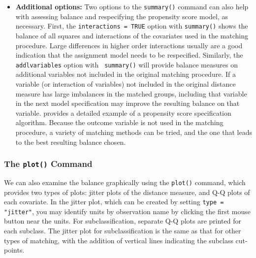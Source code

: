 \begin{itemize}
\item {\bf Additional options:} Two options to the \texttt{summary()}
  command can also help with assessing balance and respecifying the
  propensity score model, as necessary.  First, the {\tt interactions
    = TRUE} option with {\tt summary()} shows the balance of all
  squares and interactions of the covariates used in the matching
  procedure.  Large differences in higher order interactions usually
  are a good indication that the assignment model needs to be
  respecified.  Similarly, the {\tt addlvariables} option with {\tt
    summary()} will provide balance measures on additional variables
  not included in the original matching procedure.  If a variable (or
  interaction of variables) not included in the original distance
  measure has large imbalances in the matched groups, including that
  variable in the next model specification may improve the resulting
  balance on that variable.  \cite{DehWah99} provides a detailed
  example of a propensity score specification algorithm.  Because the
  outcome variable is not used in the matching procedure, a variety of
  matching methods can be tried, and the one that leads to the best
  resulting balance chosen.
\end{itemize}

\subsubsection{The \texttt{plot()} Command}

We can also examine the balance graphically using the \texttt{plot()}
command, which provides two types of plots: jitter plots of the
distance measure, and Q-Q plots of each covariate.  In the jitter
plot, which can be created by setting \texttt{type = "jitter"}, you
may identify units by observation name by clicking the first mouse
button near the units. For subclassification, separate Q-Q plots are
printed for each subclass.  The jitter plot for subclassification is
the same as that for other types of matching, with the addition of
vertical lines indicating the subclass cut-points.


